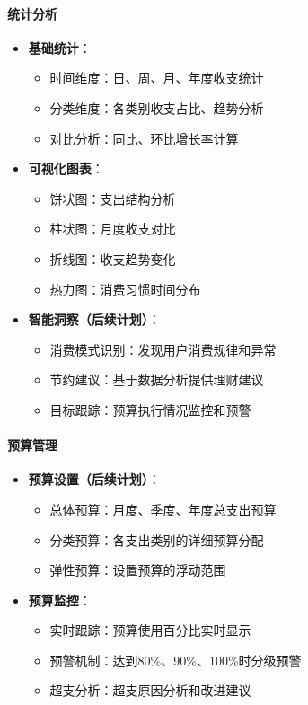 \documentclass[a4paper]{article}
\begin{document}
\paragraph{统计分析}
\begin{itemize}
    \item \textbf{基础统计}：
    \begin{itemize}
        \item 时间维度：日、周、月、年度收支统计
        \item 分类维度：各类别收支占比、趋势分析
        \item 对比分析：同比、环比增长率计算
    \end{itemize}
    \item \textbf{可视化图表}：
    \begin{itemize}
        \item 饼状图：支出结构分析
        \item 柱状图：月度收支对比
        \item 折线图：收支趋势变化
        \item 热力图：消费习惯时间分布
    \end{itemize}
    \item \textbf{智能洞察（后续计划）}：
    \begin{itemize}
        \item 消费模式识别：发现用户消费规律和异常
        \item 节约建议：基于数据分析提供理财建议
        \item 目标跟踪：预算执行情况监控和预警
    \end{itemize}
\end{itemize}

\paragraph{预算管理}
\begin{itemize}
    \item \textbf{预算设置（后续计划）}：
    \begin{itemize}
        \item 总体预算：月度、季度、年度总支出预算
        \item 分类预算：各支出类别的详细预算分配
        \item 弹性预算：设置预算的浮动范围
    \end{itemize}
    \item \textbf{预算监控}：
    \begin{itemize}
        \item 实时跟踪：预算使用百分比实时显示
        \item 预警机制：达到80\%、90\%、100\%时分级预警
        \item 超支分析：超支原因分析和改进建议
    \end{itemize}
\end{itemize}
\end{document}
